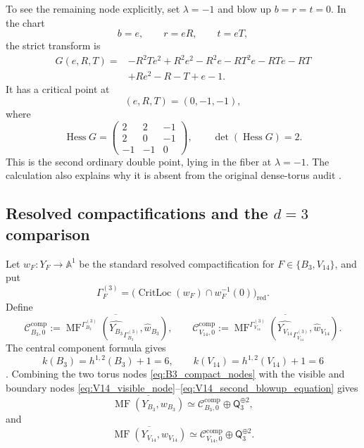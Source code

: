 \documentclass[11pt]{amsart}
\theoremstyle{definition}
\theoremstyle{remark}
\DeclareMathOperator{\MF}{MF}
\DeclareMathOperator{\CritLoc}{CritLoc}
\newcommand{\MorseCat}[1]{\mathsf{Q}_{#1}}
\newcommand{\CcompBthree}{\mathcal C^{\mathrm{comp}}_{B_3,0}}
\newcommand{\CcompVfourteen}{\mathcal C^{\mathrm{comp}}_{V_{14},0}}
\begin{document}
To see the remaining node explicitly, set $\lambda=-1$ and blow up
$b=r=t=0$.  In the chart
\[
b=e,
\qquad
r=eR,
\qquad
t=eT,
\]
the strict transform is
\begin{equation}
\label{eq:V14_second_blowup_equation}
\begin{aligned}
G(e,R,T)={}&-R^2Te^2+R^2e^2-R^2e-RT^2e-RTe-RT\\
&+Re^2-R-T+e-1.
\end{aligned}
\end{equation}
It has a critical point at
\[
(e,R,T)=(0,-1,-1),
\]
where
\[
\operatorname{Hess}G=
\begin{pmatrix}
2&2&-1\\
2&0&-1\\
-1&-1&0
\end{pmatrix},
\qquad
\det(\operatorname{Hess}G)=2.
\]
This is the second ordinary double point, lying in the fiber at
$\lambda=-1$.  The calculation also explains why it is absent from the
original dense-torus audit \cite{Przyjalkowski2026}.

\subsection{Resolved compactifications and the \texorpdfstring{$d=3$}{d=3} comparison}

Let $w_F:Y_F\to\mathbb A^1$ be the standard resolved compactification for
$F\in\{B_3,V_{14}\}$, and put
\[
\Gamma_F^{(3)}
=
\bigl(\CritLoc(w_F)\cap w_F^{-1}(0)\bigr)_{\mathrm{red}}.
\]
Define
\begin{equation}
\label{eq:d3_compact_central_categories}
\CcompBthree
:=
\overline{\MF^{\Gamma_{B_3}^{(3)}}
(\widehat{Y_{B_3}}_{\Gamma_{B_3}^{(3)}},\widehat w_{B_3})},
\qquad
\CcompVfourteen
:=
\overline{\MF^{\Gamma_{V_{14}}^{(3)}}
(\widehat{Y_{V_{14}}}_{\Gamma_{V_{14}}^{(3)}},\widehat w_{V_{14}})}.
\end{equation}
The central component formula gives
\begin{equation}
\label{eq:d3_component_count}
k(B_3)=h^{1,2}(B_3)+1=6,
\qquad
k(V_{14})=h^{1,2}(V_{14})+1=6
\end{equation}
\cite{PrzyjalkowskiHodge}.  Combining the two torus nodes
\eqref{eq:B3_compact_nodes} with the visible and boundary nodes
\eqref{eq:V14_visible_node}--\eqref{eq:V14_second_blowup_equation} gives
\begin{equation}
\label{eq:B3_compact_final_decomposition}
\overline{\MF(Y_{B_3},w_{B_3})}
\simeq
\CcompBthree\oplus\MorseCat{3}^{\oplus2},
\end{equation}
and
\begin{equation}
\label{eq:V14_compact_final_decomposition}
\overline{\MF(Y_{V_{14}},w_{V_{14}})}
\simeq
\CcompVfourteen\oplus\MorseCat{3}^{\oplus2}.
\end{equation}
\end{document}
